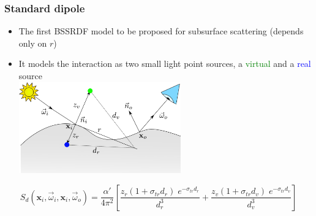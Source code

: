 \documentclass{beamer}
\newcommand{\vomega}{\vec{\omega}}
\newcommand{\x}{\mathbf{x}}
\begin{document}
\begin{frame}
    \frametitle{Standard dipole}
			\begin{itemize}
			\vspace{0.5cm}
				\item The first BSSRDF model to be proposed for subsurface scattering (depends only on $r$) 
				\item It models the interaction as two small light point sources, a \textcolor{green}{virtual} and a \textcolor{blue}{real} source \\
				\centering
				\vspace{0.2cm}
				\includegraphics[width=0.55\textwidth]{jensen}
			\end{itemize}
	$$
S_d(\x_i,\vomega_i,\x_i,\vomega_o) = \frac{\alpha'}{4 \pi^2} \left[\frac{z_r (1 + \sigma_{tr} d_r) \; e^{-\sigma_{tr} d_r}}{d_r^3} + \frac{z_v (1 + \sigma_{tr} d_v) \; e^{-\sigma_{tr} d_v}}{d_v^3} \right]
$$			
\end{frame}
\end{document}

